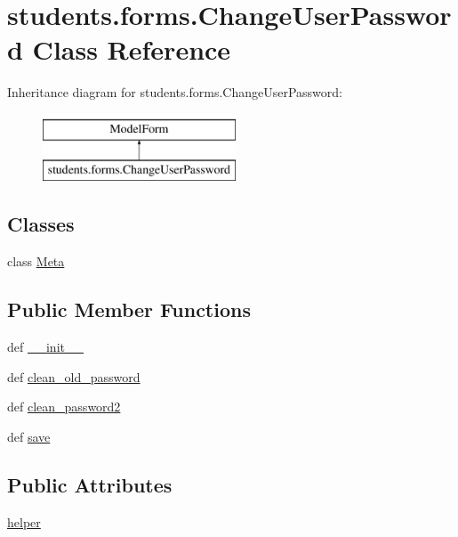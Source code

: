 \hypertarget{classstudents_1_1forms_1_1_change_user_password}{\section{students.\-forms.\-Change\-User\-Password Class Reference}
\label{classstudents_1_1forms_1_1_change_user_password}
}
Inheritance diagram for students.\-forms.\-Change\-User\-Password\-:\begin{figure}[H]
\begin{center}
\leavevmode
\includegraphics[height=2.000000cm]{classstudents_1_1forms_1_1_change_user_password}
\end{center}
\end{figure}
\subsection*{Classes}
\begin{DoxyCompactItemize}
\item 
class \hyperlink{classstudents_1_1forms_1_1_change_user_password_1_1_meta}{Meta}
\end{DoxyCompactItemize}
\subsection*{Public Member Functions}
\begin{DoxyCompactItemize}
\item 
def \hyperlink{classstudents_1_1forms_1_1_change_user_password_a400af3a93c05d7d6e3ea1158f31bd7f3}{\-\_\-\-\_\-init\-\_\-\-\_\-}
\item 
def \hyperlink{classstudents_1_1forms_1_1_change_user_password_a9e5064d034ff778807af126d1356516e}{clean\-\_\-old\-\_\-password}
\item 
def \hyperlink{classstudents_1_1forms_1_1_change_user_password_aa6903c9f9f85107a18b9b3ce687df81b}{clean\-\_\-password2}
\item 
def \hyperlink{classstudents_1_1forms_1_1_change_user_password_a3c5e1bccb71fbac3c774d759ede60dfb}{save}
\end{DoxyCompactItemize}
\subsection*{Public Attributes}
\begin{DoxyCompactItemize}
\item 
\hyperlink{classstudents_1_1forms_1_1_change_user_password_a3a93705cd4e07df9ffc88668c9c4197d}{helper}
\end{DoxyCompactItemize}
